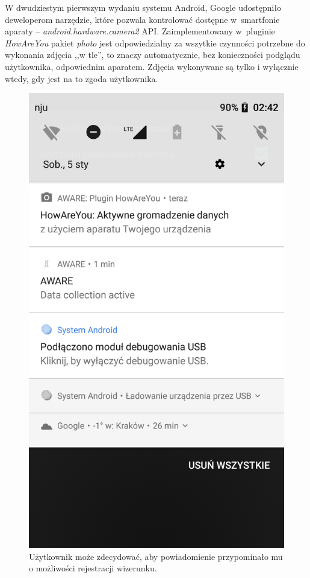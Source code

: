 W dwudziestym pierwszym wydaniu systemu Android, Google udostępniło deweloperom narzędzie, które pozwala kontrolować dostępne w~smartfonie aparaty – \textit{android.hardware.camera2} API. Zaimplementowany w~pluginie \textit{HowAreYou} pakiet \textit{photo} jest odpowiedzialny za wszytkie czynności potrzebne do wykonania zdjęcia ,,w tle'', to znaczy automatycznie, bez konieczności podglądu użytkownika, odpowiednim aparatem. Zdjęcia wykonywane są tylko i wyłącznie wtedy, gdy jest na to zgoda użytkownika.

\begin{figure}[H]
	\centering
	\includegraphics[scale=0.13]{rozdzial3/screen-background.png}
	\caption{Użytkownik może zdecydować, aby powiadomienie przypominało mu o możliwości rejestracji wizerunku.}
\end{figure}

